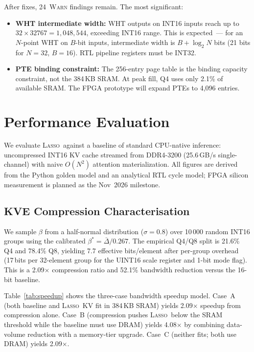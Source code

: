 \documentclass[conference]{IEEEtran}
\newcommand{\lasso}{\textsc{Lasso}}
\begin{document}
After fixes, 24~\textsc{Warn} findings remain. The most significant:
\begin{itemize}
  \item \textbf{WHT intermediate width:} WHT outputs on INT16 inputs
        reach up to $32\times 32767 = 1{,}048{,}544$, exceeding INT16
        range. This is expected~--- for an $N$-point WHT on $B$-bit
        inputs, intermediate width is $B + \log_2 N$ bits (21 bits for
        $N{=}32$, $B{=}16$). RTL pipeline registers must be INT32.
  \item \textbf{PTE binding constraint:} The 256-entry page table is
        the binding capacity constraint, not the 384\,KB SRAM. At peak
        fill, Q4 uses only 2.1\% of available SRAM. The FPGA prototype
        will expand PTEs to 4,096 entries.
\end{itemize}

\section{Performance Evaluation}
\label{sec:perf}

We evaluate \lasso\ against a baseline of standard CPU-native
inference: uncompressed INT16 KV cache streamed from DDR4-3200
(25.6\,GB/s single-channel) with naive $O(N^2)$ attention
materialization.  All figures are derived from the Python golden model
and an analytical RTL cycle model; FPGA silicon measurement is
planned as the Nov~2026 milestone.

\subsection{KVE Compression Characterisation}

We sample $\beta$ from a half-normal distribution ($\sigma{=}0.8$)
over 10\,000 random INT16 groups using the calibrated
$\beta^*{=}\bar\Delta/0.267$.  The empirical Q4/Q8 split is 21.6\%
Q4 and 78.4\% Q8, yielding 7.7 effective bits/element after
per-group overhead (17\,bits per 32-element group for the UINT16
scale register and 1-bit mode flag).  This is a 2.09$\times$
compression ratio and 52.1\% bandwidth reduction versus the 16-bit
baseline.

Table~\ref{tab:speedup} shows the three-case bandwidth speedup model.
Case~A (both baseline and \lasso\ KV fit in 384\,KB SRAM) yields
2.09$\times$ speedup from compression alone.  Case~B (compression
pushes \lasso\ below the SRAM threshold while the baseline must use
DRAM) yields 4.08$\times$ by combining data-volume reduction with a
memory-tier upgrade.  Case~C (neither fits; both use DRAM) yields
2.09$\times$.
\end{document}
